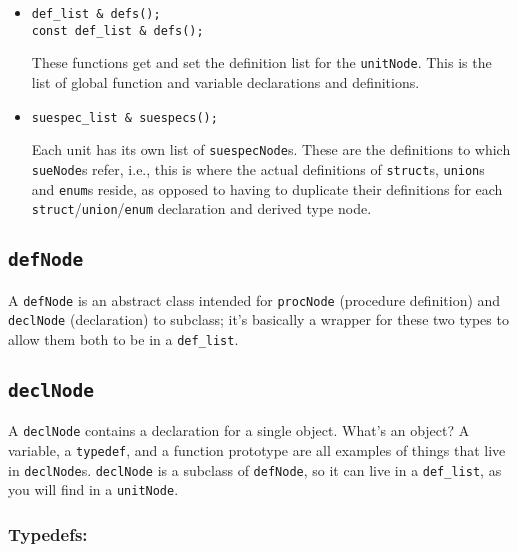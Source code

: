 \documentclass[10pt]{article}
\begin{document}
\begin{itemize}

\item

\begin{small}
\begin{verbatim}
def_list & defs();
const def_list & defs();
\end{verbatim}
\end{small}

These functions get and set the definition list for the {\tt unitNode}.  This
is the list of global function and variable declarations and definitions.
 
\item
\begin{small}
\begin{verbatim}
suespec_list & suespecs(); 
\end{verbatim}
\end{small}

Each unit has its own list of {\tt suespecNode}s.  These are the definitions
to which {\tt sueNode}s refer, i.e., this is where the actual definitions
of {\tt struct}s, {\tt union}s and {\tt enum}s reside, as opposed to having
to duplicate their definitions for each {\tt struct}/{\tt union}/{\tt enum}
declaration and derived type node.

\end{itemize}

\subsection{{\tt defNode}}

A {\tt defNode} is an abstract class intended for {\tt procNode} (procedure
definition) and {\tt declNode} (declaration) to subclass; it's basically
a wrapper for these two types to allow them both to be in a {\tt def\_list}.


\subsection{{\tt declNode}}

A {\tt declNode} contains a declaration for a single object.  What's
an object?  A variable, a {\tt typedef}, and a function prototype are
all examples of things that live in {\tt declNode}s.  {\tt declNode} is
a subclass of {\tt defNode}, so it can live in a {\tt def\_list}, as you
will find in a {\tt unitNode}.

\subsubsection*{Typedefs:}
\end{document}

